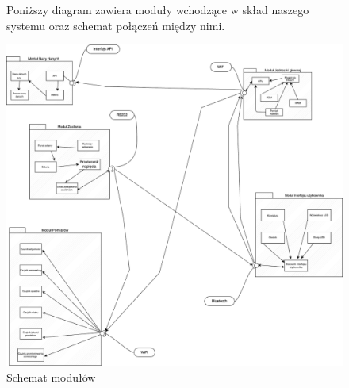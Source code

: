 \documentclass{article}
\begin{document}
\begin{figure}
    \centering
    \begin{minipage}{0.6\textwidth}
        \centering
        \large Poniższy diagram zawiera moduły wchodzące w skład naszego systemu oraz schemat połączeń między nimi.
    \end{minipage}
    \includegraphics[scale=0.5]{moduły.png}
    \caption{Schemat modułów}
    \label{etykieta}
\end{figure}
\end{document}
